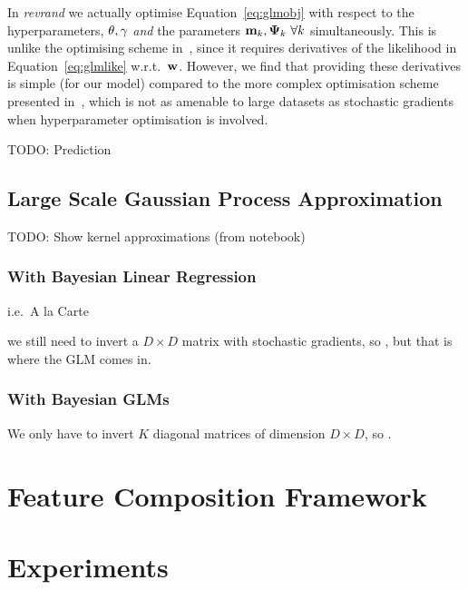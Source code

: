 \documentclass[11pt, oneside]{article}
\begin{document}
In \emph{revrand} we actually optimise Equation~\eqref{eq:glmobj} with respect
to the hyperparameters, $\theta, \gamma$ \emph{and} the parameters $\mathbf{m}_k,
\boldsymbol{\Psi}_k~\forall k$ simultaneously. This is unlike the optimising scheme 
in~\cite{gershman2012}, since it requires  derivatives of the
likelihood in Equation~\eqref{eq:glmlike} w.r.t.\ $\mathbf{w}$. However, we find
that providing these derivatives is simple (for our model) compared to the more
complex optimisation scheme presented in~\cite{gershman2012}, which is not as
amenable to large datasets as stochastic gradients when hyperparameter 
optimisation is involved.

TODO: Prediction

\subsection{Large Scale Gaussian Process Approximation}

TODO: Show kernel approximations (from notebook)


\subsubsection{With Bayesian Linear Regression}

i.e.\ A la Carte~\cite{yang2014}

we still need to invert a $D \times D$ matrix with stochastic gradients, so
, but that is where the GLM comes in.


\subsubsection{With Bayesian GLMs}

We only have to invert $K$ diagonal matrices of dimension $D \times D$, so
.

\section{Feature Composition Framework}

\section{Experiments}


\printbibliography%
\end{document}
